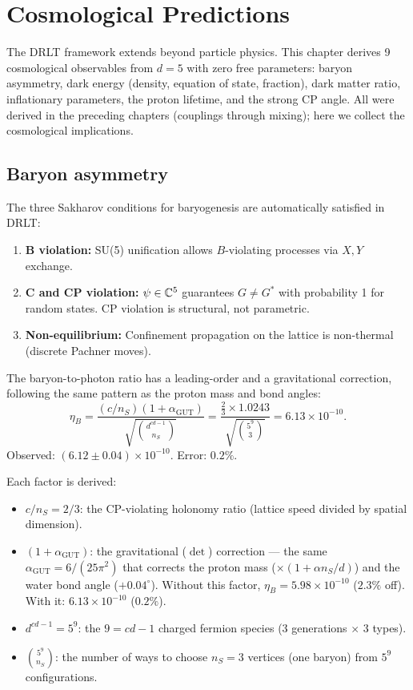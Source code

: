\section{Cosmological Predictions}
\label{ch:cosmology}

The DRLT framework extends beyond particle physics. This chapter derives 9 cosmological observables from $d = 5$ with zero free parameters: baryon asymmetry, dark energy (density, equation of state, fraction), dark matter ratio, inflationary parameters, the proton lifetime, and the strong CP angle. All were derived in the preceding chapters (couplings through mixing); here we collect the cosmological implications.

\subsection{Baryon asymmetry}

The three Sakharov conditions for baryogenesis are automatically satisfied in DRLT:
\begin{enumerate}
\item \textbf{B violation:} SU(5) unification allows $B$-violating processes via $X, Y$ exchange.
\item \textbf{C and CP violation:} $\psi \in \mathbb{C}^5$ guarantees $G \neq G^*$ with probability 1 for random states. CP violation is structural, not parametric.
\item \textbf{Non-equilibrium:} Confinement propagation on the lattice is non-thermal (discrete Pachner moves).
\end{enumerate}

The baryon-to-photon ratio has a leading-order and a gravitational correction, following the same pattern as the proton mass and bond angles:
\begin{equation}
\eta_B = \frac{(c/n_S)(1 + \alpha_\text{GUT})}{\sqrt{\binom{d^{cd-1}}{n_S}}} = \frac{\frac{2}{3} \times 1.0243}{\sqrt{\binom{5^9}{3}}} = 6.13 \times 10^{-10}.
\end{equation}
Observed: $(6.12 \pm 0.04) \times 10^{-10}$. Error: $0.2\%$.

Each factor is derived:
\begin{itemize}
\item $c/n_S = 2/3$: the CP-violating holonomy ratio (lattice speed divided by spatial dimension).
\item $(1 + \alpha_\text{GUT})$: the gravitational ($\det$) correction --- the same $\alpha_\text{GUT} = 6/(25\pi^2)$ that corrects the proton mass ($\times(1 + \alpha n_S/d)$) and the water bond angle ($+0.04^\circ$). Without this factor, $\eta_B = 5.98 \times 10^{-10}$ ($2.3\%$ off). With it: $6.13 \times 10^{-10}$ ($0.2\%$).
\item $d^{cd-1} = 5^9$: the $9 = cd - 1$ charged fermion species ($3$ generations $\times$ $3$ types).
\item $\binom{5^9}{n_S}$: the number of ways to choose $n_S = 3$ vertices (one baryon) from $5^9$ configurations.
\end{itemize}

